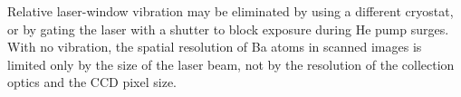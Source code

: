 Relative laser-window vibration may be eliminated by using a different cryostat, or by gating the laser with a shutter to block exposure during He pump surges.  With no vibration, the spatial resolution of Ba atoms in scanned images is limited only by the size of the laser beam, not by the resolution of the collection optics and the CCD pixel size.


